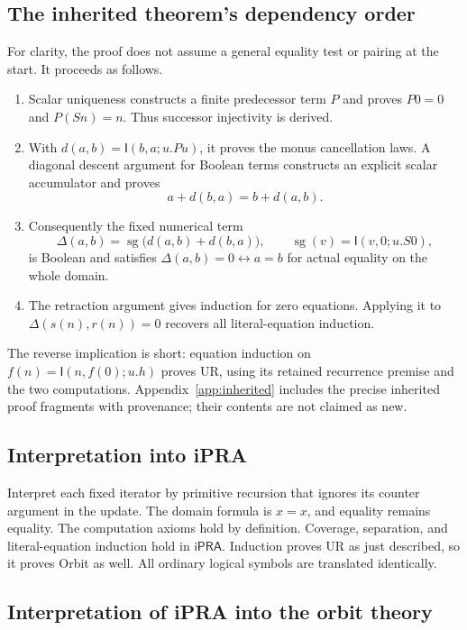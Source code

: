 \documentclass[11pt]{article}
\theoremstyle{definition}
\newcommand{\ipra}{\mathsf{iPRA}}
\newcommand{\I}{\mathsf I}
\begin{document}
\subsection{The inherited theorem's dependency order}

For clarity, the proof does not assume a general equality test or pairing at the start. It proceeds as follows.
\begin{enumerate}
\item Scalar uniqueness constructs a finite predecessor term $P$ and proves $P0=0$ and $P(Sn)=n$. Thus successor injectivity is derived.
\item With $d(a,b)=\I(b,a;u.Pu)$, it proves the monus cancellation laws. A diagonal descent argument for Boolean terms constructs an explicit scalar accumulator and proves
\[
 a+d(b,a)=b+d(a,b).
\]
\item Consequently the fixed numerical term
\[
 \Delta(a,b)=\operatorname{sg}\bigl(d(a,b)+d(b,a)\bigr),
 \qquad \operatorname{sg}(v)=\I(v,0;u.S0),
\]
is Boolean and satisfies $\Delta(a,b)=0\leftrightarrow a=b$ for actual equality on the whole domain.
\item The retraction argument gives induction for zero equations. Applying it to $\Delta(s(n),r(n))=0$ recovers all literal-equation induction.
\end{enumerate}
The reverse implication is short: equation induction on
$f(n)=\I(n,f(0);u.h)$ proves UR, using its retained recurrence premise and the two computations. Appendix~\ref{app:inherited} includes the precise inherited proof fragments with provenance; their contents are not claimed as new.

\subsection{Interpretation into iPRA}

Interpret each fixed iterator by primitive recursion that ignores its counter argument in the update. The domain formula is $x=x$, and equality remains equality. The computation axioms hold by definition. Coverage, separation, and literal-equation induction hold in $\ipra$. Induction proves UR as just described, so it proves Orbit as well. All ordinary logical symbols are translated identically.

\subsection{Interpretation of iPRA into the orbit theory}
\end{document}
